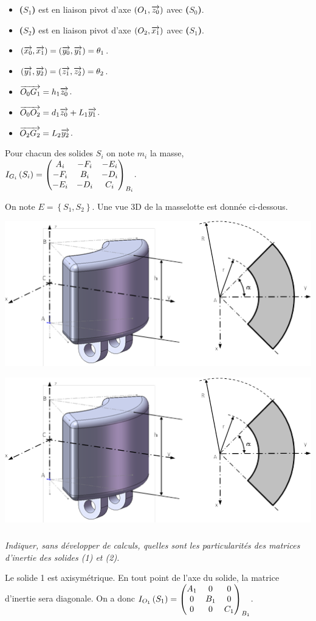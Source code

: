 \documentclass[10pt,fleqn]{article} %
\begin{document}
\begin{multicols}{2}
\begin{itemize}
\item \textbf{($S_1$)} est en liaison pivot d'axe $\axe{O_1}{z_0}$ avec \textbf{($S_0$)}.
\item \textbf{($S_2$)} est en liaison pivot d'axe $\axe{O_2}{x_1}$ avec \textbf{($S_1$)}.
\item $\angl{x_0}{x_1} = \angl{y_0}{y_1}=\theta_1$.
\item $\angl{y_1}{y_2} = \angl{z_1}{z_2}=\theta_2$.
\item $\vect{O_0G_1}=h_1\vect{z_0}$.
\item $\vect{O_0O_2}=d_1\vect{z_0}+L_1\vect{y_1}$.
\item $\vect{O_2G_2}=L_2\vect{y_2}$.
\end{itemize}
Pour chacun des solides $S_i$ on note $m_i$ la masse, $\inertie{G_i}{S_i}=\matinertie{A_i}{B_i}{C_i}{-D_i}{-E_i}{-F_i}{B_i}$.

On note $E=\left\{ S_1,S_2\right\}$. 
Une vue 3D de la masselotte est donnée ci-dessous. 

\ifprof
\begin{center}
\includegraphics[width=.5\linewidth]{images/fig_03}
\end{center}
\else
\begin{center}
\includegraphics[width=\linewidth]{images/fig_03}
\end{center}
\fi

\subparagraph{}\textit{Indiquer, sans développer de calculs, quelles sont les particularités des matrices d’inertie des solides (1) et (2).}
\ifprof
\begin{corrige}
Le solide 1 est axisymétrique. En tout point de l'axe du solide, la matrice d'inertie sera diagonale. On a donc $\inertie{O_1}{S_1}=\matinertie{A_1}{B_1}{C_1}{0}{0}{0}{B_1}$.


\end{corrige}
\end{multicols}
\end{document}
